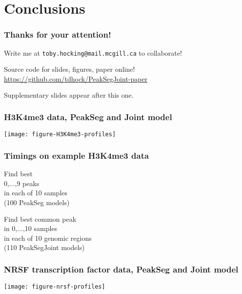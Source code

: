\documentclass{beamer}
\begin{document}
\section{Conclusions}

\begin{frame}
  \frametitle{Thanks for your attention!}
  Write me at \alert{\texttt{toby.hocking@mail.mcgill.ca}} to collaborate!

  \vskip 1cm

  Source code for slides, figures, paper online!\\
  \small
  \url{https://github.com/tdhock/PeakSegJoint-paper}
  \vskip 1cm

  Supplementary slides appear after this one.

\end{frame}

\begin{frame}
  \frametitle{H3K4me3 data, PeakSeg and Joint model}

  \texttt{[image: figure-H3K4me3-profiles]}
\end{frame}

\begin{frame}
  \frametitle{Timings on example H3K4me3 data}

  \small

\parbox{1.5in}{
  Find best \\
  0,...,9 peaks\\
  in each of 10 samples\\
  (100 PeakSeg models)

  
}
\parbox{2in}{
  Find best common peak\\
  in 0,...,10 samples\\
  in each of 10 genomic regions\\
  (110 PeakSegJoint models)

  
}

\end{frame}

\begin{frame}
  \frametitle{NRSF transcription factor data, PeakSeg and Joint model}

  \texttt{[image: figure-nrsf-profiles]}
\end{frame}
\end{document}
